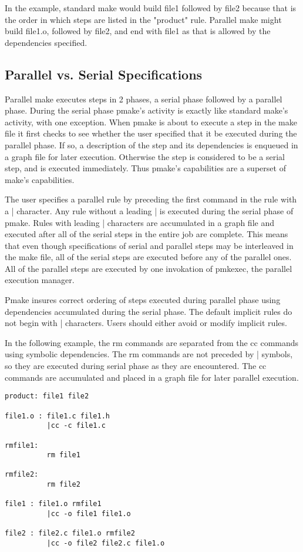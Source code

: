 In the example, standard make would build file1 followed by file2 because that
is the order in which steps are listed in the "product" rule.  Parallel make
might build file1.o, followed by file2, and end with file1 as that is allowed
by the dependencies specified.

 
\subsection*{Parallel vs. Serial Specifications}

Parallel make executes steps in 2 phases, a serial phase followed by a 
parallel phase.  During the serial phase pmake's activity is exactly like
standard make's activity, with one exception.  When pmake is about to execute
a step in the make file it first checks to see whether the user specified that
it be executed during the parallel phase.  If so, a description of the step
and its dependencies is enqueued in a graph file for later execution. 
Otherwise the step is considered to be a serial step, and is executed
immediately.  Thus pmake's capabilities are a superset of make's capabilities.

The user specifies a parallel rule by preceding the first command in the rule
with a | character.  Any rule without a leading | is executed during the serial
phase of pmake.  Rules with leading | characters are accumulated in a graph
file and executed after all of the serial steps in the entire job are complete.
This means that even though specifications of serial and parallel steps may
be interleaved in the make file, all of the serial steps are executed before
any of the parallel ones.  All of the parallel steps are executed by one
invokation of pmkexec, the parallel execution manager.

Pmake insures correct ordering of steps executed during parallel phase using
dependencies accumulated during the serial phase.  The default implicit
rules do not begin with | characters.  Users should either avoid or modify
implicit rules.
 
In the following example, the rm commands are separated from the cc commands
using symbolic dependencies.  The rm commands are not preceded by | symbols, so
they are executed during serial phase as they are encountered. The cc commands
are accumulated and placed in a graph file for later parallel execution.

\begin{verbatim}
product: file1 file2
 
file1.o : file1.c file1.h
          |cc -c file1.c
 
rmfile1:
          rm file1
 
rmfile2:
          rm file2
 
file1 : file1.o rmfile1
          |cc -o file1 file1.o
 
file2 : file2.c file1.o rmfile2
          |cc -o file2 file2.c file1.o
\end{verbatim}
 
